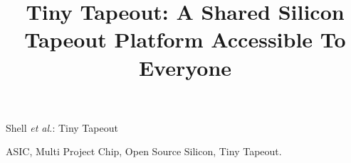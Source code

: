 \documentclass[journal]{IEEEtran}
\begin{document}

\title{Tiny Tapeout: A Shared Silicon Tapeout Platform Accessible To Everyone}



%
{Shell \MakeLowercase{\textit{et al.}}: Tiny Tapeout}


\maketitle


\begin{IEEEkeywords}
ASIC, Multi Project Chip, Open Source Silicon, Tiny Tapeout.
\end{IEEEkeywords}











%






\end{document}
